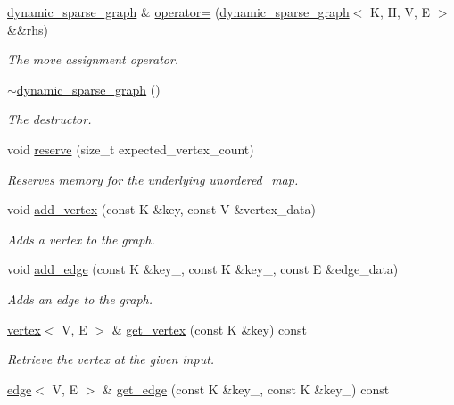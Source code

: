 \begin{DoxyCompactItemize}
\hyperlink{classdynamic__sparse__graph}{dynamic\+\_\+sparse\+\_\+graph} \& \hyperlink{classdynamic__sparse__graph_a4cb2ab8ecfd4c69ea31ff414da9ba953}{operator=} (\hyperlink{classdynamic__sparse__graph}{dynamic\+\_\+sparse\+\_\+graph}$<$ K, H, V, E $>$ \&\&rhs)
\begin{DoxyCompactList}\small\item\em The move assignment operator. \end{DoxyCompactList}\item 
\hyperlink{classdynamic__sparse__graph_ad550e140d53117698201ca22574ec1a6}{$\sim$dynamic\+\_\+sparse\+\_\+graph} ()
\begin{DoxyCompactList}\small\item\em The destructor. \end{DoxyCompactList}\item 
void \hyperlink{classdynamic__sparse__graph_a84bc595af88b2172862987db75c4f830}{reserve} (size\+\_\+t expected\+\_\+vertex\+\_\+count)
\begin{DoxyCompactList}\small\item\em Reserves memory for the underlying unordered\+\_\+map. \end{DoxyCompactList}\item 
void \hyperlink{classdynamic__sparse__graph_a1e079c373c2365513912b2f1db665fdd}{add\+\_\+vertex} (const K \&key, const V \&vertex\+\_\+data)
\begin{DoxyCompactList}\small\item\em Adds a vertex to the graph. \end{DoxyCompactList}\item 
void \hyperlink{classdynamic__sparse__graph_a9eb5cc4431b2b76d01c3a853e04c610a}{add\+\_\+edge} (const K \&key\+\_, const K \&key\+\_, const E \&edge\+\_\+data)
\begin{DoxyCompactList}\small\item\em Adds an edge to the graph. \end{DoxyCompactList}\item 
\hyperlink{structvertex}{vertex}$<$ V, E $>$ \& \hyperlink{classdynamic__sparse__graph_a9efd32f8a74d04dbc6580176ac9c5840}{get\+\_\+vertex} (const K \&key) const 
\begin{DoxyCompactList}\small\item\em Retrieve the vertex at the given input. \end{DoxyCompactList}\item 
\hyperlink{structedge}{edge}$<$ V, E $>$ \& \hyperlink{classdynamic__sparse__graph_ab25a322a5ece881ea7ca71fb4b6d3dd2}{get\+\_\+edge} (const K \&key\+\_, const K \&key\+\_) const 

\end{DoxyCompactItemize}
